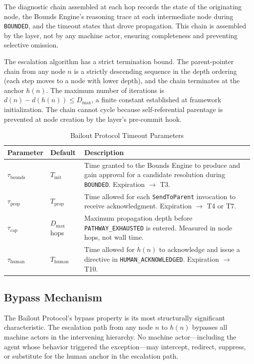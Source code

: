 The diagnostic chain assembled at each hop records the state of the originating node, the Bounds Engine's reasoning trace at each intermediate node during \texttt{BOUNDED}, and the timeout states that drove propagation. This chain is assembled by the \fact{} layer, not by any machine actor, ensuring completeness and preventing selective omission.

The escalation algorithm has a strict termination bound. The parent-pointer chain from any node $n$ is a strictly descending sequence in the depth ordering (each step moves to a node with lower depth), and the chain terminates at the anchor $h(n)$. The maximum number of iterations is $d(n) - d(h(n)) \leq D_{\max}$, a finite constant established at framework initialization. The chain cannot cycle because self-referential parentage is prevented at node creation by the \fact{} layer's pre-commit hook.

\begin{table}[t]
\caption{Bailout Protocol Timeout Parameters}
\label{tab:bp-timeouts}
\medskip
\noindent\begin{tabular}{lp{3cm}p{5.5cm}}
\toprule
\textbf{Parameter} & \textbf{Default} & \textbf{Description} \\
\midrule
$\tau_{\text{bounds}}$ & $T_{\text{init}}$ & Time granted to the Bounds Engine to produce and gain approval for a candidate resolution during \texttt{BOUNDED}. Expiration $\rightarrow$ T3. \\
$\tau_{\text{prop}}$ & $T_{\text{prop}}$ & Time allowed for each \texttt{SendToParent} invocation to receive acknowledgment. Expiration $\rightarrow$ T4 or T7. \\
$\tau_{\text{cap}}$ & $D_{\max}$ hops & Maximum propagation depth before \texttt{PATHWAY\_EXHAUSTED} is entered. Measured in node hops, not wall time. \\
$\tau_{\text{human}}$ & $T_{\text{human}}$ & Time allowed for $h(n)$ to acknowledge and issue a directive in \texttt{HUMAN\_ACKNOWLEDGED}. Expiration $\rightarrow$ T10. \\
\bottomrule
\end{tabular}
\end{table}

\subsection{Bypass Mechanism}
\label{sec:bp-bypass}

The Bailout Protocol's bypass property is its most structurally significant characteristic. The escalation path from any node $n$ to $h(n)$ bypasses all machine actors in the intervening hierarchy. No machine actor---including the agent whose behavior triggered the exception---may intercept, redirect, suppress, or substitute for the human anchor in the escalation path.

